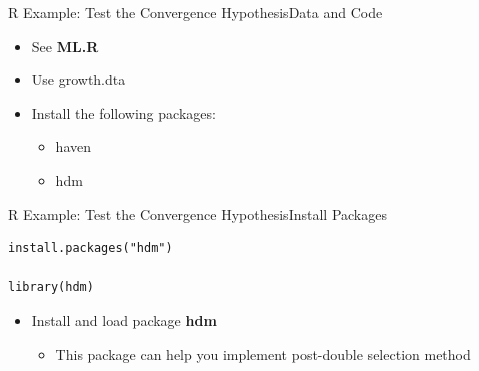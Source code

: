 \documentclass[dvipsnames,hyperref={pdfpagelabels=false}]{beamer}
\begin{document}
\institute{}






\date
{}


\begin{frame}{}
	\titlepage
\end{frame}






\begin{frame}[fragile]{R Example: Test the Convergence Hypothesis}{Data and Code}
	\begin{itemize}
		\item See \textbf{ML.R}
		\vspace{0.2cm}
		\item Use growth.dta
		\vspace{0.2cm}
		\item Install the following packages:
		\begin{itemize}
			\vspace{0.2cm}
			\item haven
			\item hdm
		\end{itemize}
		
	\end{itemize}
\end{frame}



\begin{frame}[fragile]{R Example: Test the Convergence Hypothesis}{Install Packages}
		
\begin{lstlisting}
install.packages("hdm") 

library(hdm)
\end{lstlisting}
		
	\begin{itemize}
		\item Install and load package \textbf{hdm}
		\vspace{0.2cm}
		\begin{itemize}
			\item This package can help you implement post-double selection method
			
		\end{itemize}
	\end{itemize}
\end{frame}
\end{document}
